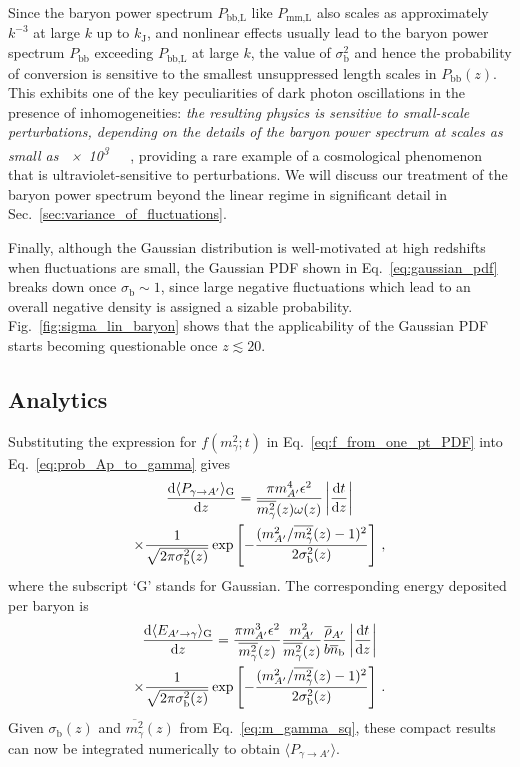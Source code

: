 \documentclass[prd,aps,10pt,nofootinbib,twocolumn,superscriptaddress,preprintnumbers,balancelastpage,longbibliography]{revtex4-1}
\begin{document}
Since the baryon power spectrum $P_\text{bb,L}$  like $P_\text{mm,L}$ also scales as approximately $k^{-3}$ at large $k$ up to $k_\text{J}$, and nonlinear effects usually lead to the baryon power spectrum $P_\text{bb}$ exceeding $P_\text{bb,L}$ at large $k$, the value of $\sigma_\text{b}^2$ and hence the probability of conversion is sensitive to the smallest unsuppressed length scales in $P_\text{bb}(z)$. 
This exhibits one of the key peculiarities of dark photon oscillations in the presence of inhomogeneities: \textit{the resulting physics is sensitive to small-scale perturbations, depending on the details of the baryon power spectrum at scales as small as \SI{e3}{\per\mega\parsec}}, providing a rare example of a cosmological phenomenon that is ultraviolet-sensitive to perturbations. 
We will discuss our treatment of the baryon power spectrum beyond the linear regime in significant detail in Sec.~\ref{sec:variance_of_fluctuations}. 

Finally, although the Gaussian distribution is well-motivated at high redshifts when fluctuations are small, the Gaussian PDF shown in Eq.~\eqref{eq:gaussian_pdf} breaks down once $\sigma_\text{b} \sim 1$, since large negative fluctuations which lead to an overall negative density is assigned a sizable probability. Fig.~\ref{fig:sigma_lin_baryon} shows that the applicability of the Gaussian PDF starts becoming questionable once $z \lesssim 20$. 

\subsection{Analytics}

Substituting the expression for $f(m_\gamma^2;t)$ in Eq.~\eqref{eq:f_from_one_pt_PDF} into Eq.~\eqref{eq:prob_Ap_to_gamma} gives
%
\begin{multline}
    \frac{\mathrm{d} \langle P_{\gamma \to A'} \rangle_\text{G}}{\mathrm{d} z} = \frac{\pi m_{A'}^4 \epsilon^2}{\overline{m_\gamma^2}(z) \omega(z)} \left| \frac{\mathrm{d} t}{\mathrm{d} z} \right|\\
    \times \frac{1}{\sqrt{2\pi \sigma_\text{b}^2(z)}} \exp \left[- \frac{(m_{A^\prime}^2/\overline{m_\gamma^2}(z) - 1)^2}{2 \sigma_\text{b}^2(z)}\right] \,,
    \label{eq:dP_dz_gaussian}
\end{multline}
%
where the subscript `G' stands for Gaussian. The corresponding energy deposited per baryon is
%
\begin{multline}
    \frac{\mathrm{d} \langle E_{A' \to \gamma} \rangle_\text{G}}{\mathrm{d} z} = \frac{\pi m_{A^\prime}^3 \epsilon^2}{\overline{m_\gamma^2}(z)} \frac{m_{A^\prime}^2}{\overline{m_\gamma^2}(z)} \frac{\overline{\rho}_{A'}}{b \overline{n}_\text{b}} \left| \frac{\mathrm{d} t}{\mathrm{d} z} \right| \\
    \times \frac{1}{\sqrt{2\pi \sigma_\text{b}^2(z)}} \exp \left[- \frac{(m_{A^\prime}^2 / \overline{m_\gamma^2}(z) - 1)^2}{2 \sigma_\text{b}^2(z)}\right] \,.
\end{multline}
%
Given $\sigma_\text{b}(z)$ and $\overline{m_\gamma^2}(z)$ from Eq.~\eqref{eq:m_gamma_sq}, these compact results can now be integrated numerically to obtain $\langle P_{\gamma \to A'} \rangle$. 
\end{document}
